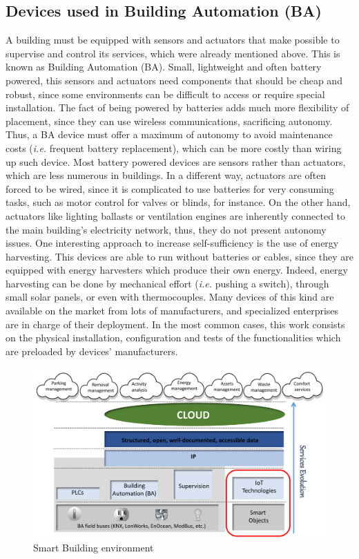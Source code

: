 \subsection{Devices used in Building Automation (BA)}
\label{subsec:Devices4BA}
A building must be equipped with sensors and actuators that make possible to supervise and control its services, which were already mentioned above.
This is known as Building Automation (BA).
Small, lightweight and often battery powered, this sensors and actuators need components that should be cheap and robust, since some environments can be difficult to access or require special installation\cite{younis2008placement}.
The fact of being powered by batteries adds much more flexibility of placement, since they can use wireless communications, sacrificing autonomy.
Thus, a BA device must offer a maximum of autonomy to avoid maintenance costs (\textit{i.e.} frequent battery replacement), which can be more costly than wiring up such device.
Most battery powered devices are sensors rather than actuators, which are less numerous in buildings.
In a different way, actuators are often forced to be wired, since it is complicated to use batteries for very consuming tasks, such as motor control for valves or blinds, for instance.
On the other hand, actuators like lighting ballasts or ventilation engines are inherently connected to the main building's electricity network, thus, they do not present autonomy issues.
One interesting approach to increase self-sufficiency is the use of energy harvesting\cite{grassl2006energy}.
This devices are able to run without batteries or cables, since they are equipped with energy harvesters which produce their own energy.
Indeed, energy harvesting can be done by mechanical effort (\textit{i.e.} pushing a switch), through small solar panels, or even with thermocouples.
Many devices of this kind are available on the market from lots of manufacturers, and specialized enterprises are in charge of their deployment.
In the most common cases, this work consists on the physical installation, configuration and tests of the functionalities which are preloaded by devices' manufacturers.

\begin{figure}[htb]
	\centering
	\includegraphics[width=1\columnwidth]{chapters/background.images/SmartServices.pdf}
	\caption{Smart Building environment}
	\label{fig:SmartServices}
\end{figure}

